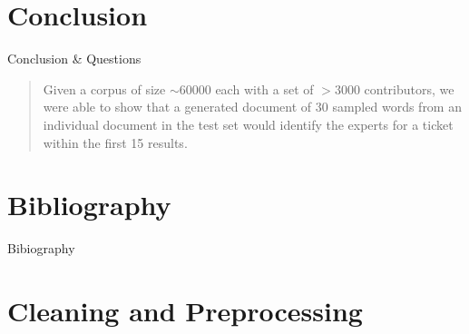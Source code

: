 \documentclass[10pt]{beamer}
\begin{document}
\section{Conclusion}

\begin{frame}{Conclusion \& Questions}

  \begin{quote}
    Given a corpus of size $\sim 60000$ each with a set of $>3000$ contributors, we were able to show that a generated document of $30$ sampled words from an individual document in the test set would identify the experts for a ticket within the first 15 results.
  \end{quote}

\end{frame}

\section{Bibliography}

\begin{frame}[allowframebreaks]{Bibiography}
  \tiny
  {}


\end{frame}

\section{Cleaning and Preprocessing}
\end{document}
